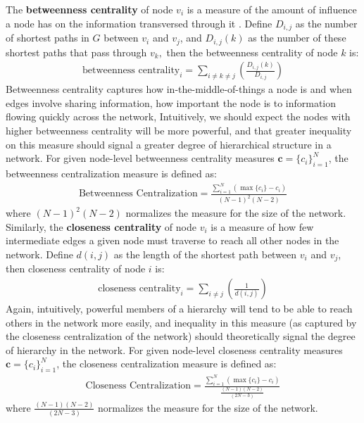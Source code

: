 \documentclass[3p,times]{elsarticle}
\begin{document}
The \textbf{betweenness centrality} of node $v_{i}$ is a measure of the amount of influence a node has on the information transversed through it \cite{between}. Define $D_{i,j}$ as the number of shortest paths in $G$ between $v_{i}$ and $v_{j}$, and $D_{i,j}(k)$ as the number of these shortest paths that pass through $v_{k},$ then the betweenness centrality of node $k$ is:
\begin{align}
	\text{betweenness centrality}_i = \sum_{i\neq k\neq j}{(\frac{D_{i,j}(k)}{D_{i,j}})}
\end{align}
Betweenness centrality captures how in-the-middle-of-things a node is and when edges involve sharing information, how important the node is to information flowing quickly across the network, Intuitively, we should expect the nodes with higher betweenness centrality will be more powerful, and that greater inequality on this measure should signal a greater degree of hierarchical structure in a network. For given node-level betweenness centrality measures $\mathbf{c} = \{c_i\}_{i=1}^N$, the betweenness centralization measure is defined as: 
\begin{align}
	\text{Betweenness Centralization} = \frac{\sum_{i=1}^{N}{(\max\{c_{i}\}-c_{i})}}{(N-1)^2(N-2)}
\end{align}
where $(N-1)^2(N-2)$ normalizes the measure for the size of the network. Similarly, the \textbf{closeness centrality} of node $v_{i}$ is a measure of how few intermediate edges a given node must traverse to reach all other nodes in the network. Define $d(i,j)$ as the length of the shortest path between $v_{i}$ and $v_{j}$, then closeness centrality of node $i$ is: 
\begin{align}
	\text{closeness centrality}_i = \sum_{i\neq j}{(\frac{1}{d(i,j)})}
\end{align}
Again, intuitively, powerful members of a hierarchy will tend to be able to reach others in the network more easily, and inequality in this measure (as captured by the closeness centralization of the network) should theoretically signal the degree of hierarchy in the network. For given node-level closeness centrality measures $\mathbf{c} = \{c_i\}_{i=1}^N$, the closeness centralization measure is defined as: 
\begin{align}
	\text{Closeness Centralization} = \frac{\sum_{i=1}^{N}{(\max\{c_{i}\}-c_{i})}}{\frac{(N-1)(N-2)}{(2N-3)}}
\end{align}
where $\frac{(N-1)(N-2)}{(2N-3)}$ normalizes the measure for the size of the network.
\end{document}
